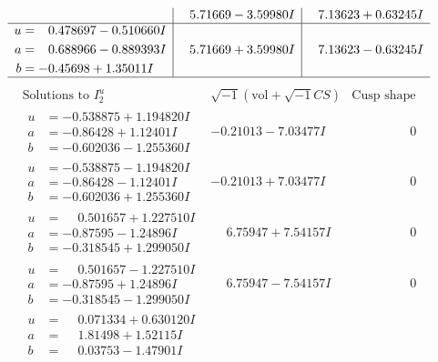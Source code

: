 \documentclass[1p]{elsarticle_modified}
\theoremstyle{definition}
\newcommand{\I}{\sqrt{-1}}
\begin{document}
$$\begin{array}{c|c|c}
 & \phantom{-}5.71669 - 3.59980 I & \phantom{-}7.13623 + 0.63245 I \\ \hline\begin{aligned}
u &= \phantom{-}0.478697 - 0.510660 I \\
a &= \phantom{-}0.688966 - 0.889393 I \\
b &= -0.45698 + 1.35011 I\end{aligned}
 & \phantom{-}5.71669 + 3.59980 I & \phantom{-}7.13623 - 0.63245 I\\
 \hline 
 \end{array}$$\newpage$$\begin{array}{c|c|c}  
\text{Solutions to }I^u_{2}& \I (\text{vol} + \sqrt{-1}CS) & \text{Cusp shape}\\
 \hline 
\begin{aligned}
u &= -0.538875 + 1.194820 I \\
a &= -0.86428 + 1.12401 I \\
b &= -0.602036 - 1.255360 I\end{aligned}
 & -0.21013 - 7.03477 I & \phantom{-0.000000 } 0 \\ \hline\begin{aligned}
u &= -0.538875 - 1.194820 I \\
a &= -0.86428 - 1.12401 I \\
b &= -0.602036 + 1.255360 I\end{aligned}
 & -0.21013 + 7.03477 I & \phantom{-0.000000 } 0 \\ \hline\begin{aligned}
u &= \phantom{-}0.501657 + 1.227510 I \\
a &= -0.87595 - 1.24896 I \\
b &= -0.318545 + 1.299050 I\end{aligned}
 & \phantom{-}6.75947 + 7.54157 I & \phantom{-0.000000 } 0 \\ \hline\begin{aligned}
u &= \phantom{-}0.501657 - 1.227510 I \\
a &= -0.87595 + 1.24896 I \\
b &= -0.318545 - 1.299050 I\end{aligned}
 & \phantom{-}6.75947 - 7.54157 I & \phantom{-0.000000 } 0 \\ \hline\begin{aligned}
u &= \phantom{-}0.071334 + 0.630120 I \\
a &= \phantom{-}1.81498 + 1.52115 I \\
b &= \phantom{-}0.03753 - 1.47901 I\end{aligned}

\end{array}$$
\end{document}
